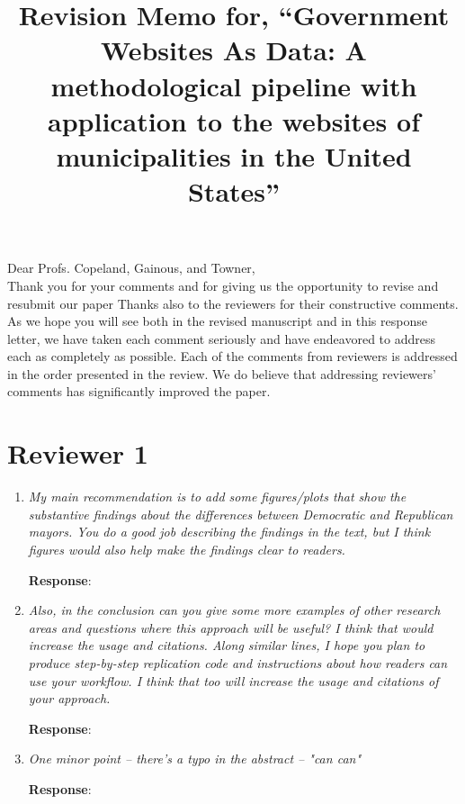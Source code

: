 \documentclass[12pt,titlepage]{article}
\title{Revision Memo for, ``Government Websites As Data: A methodological pipeline with application to the websites of municipalities in the United States''}
\begin{document}
\maketitle

Dear Profs. Copeland, Gainous, and Towner,\\

Thank you for your comments and for giving us the opportunity to revise and resubmit our paper Thanks also to the reviewers for their constructive comments. As we hope you will see both in the revised manuscript and in this response letter, we have taken each comment seriously and have endeavored to address each as completely as possible. Each of the comments from reviewers is addressed in the order presented in the review. We do believe that addressing reviewers' comments has significantly improved the paper. \\

\section*{Reviewer 1}

\begin{enumerate}


\item \emph{My main recommendation is to add some figures/plots that show the substantive findings about the differences between Democratic and Republican mayors.  You do a good job describing the findings in the text, but I think figures would also help make the findings clear to readers.  } 

	\textbf{Response}: 	
	
	\item \emph{ Also, in the conclusion can you give some more examples of other research areas and questions where this approach will be useful? I think that would increase the usage and citations. Along similar lines, I hope you plan to produce step-by-step replication code and instructions about how readers can use your workflow.  I think that too will increase the usage and citations of your approach.  } 

	\textbf{Response}: 

\item \emph{ One minor point -- there's a typo in the abstract -- "can can" } 


\textbf{Response}: 	


\end{enumerate}
\end{document}
